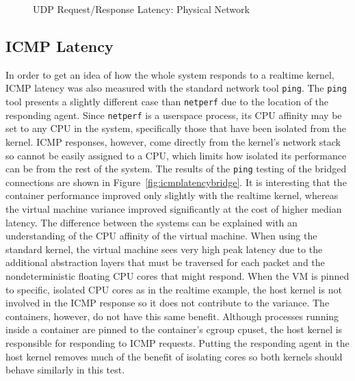 \begin{figure}
    \centering
    \def\svgwidth{\columnwidth}
    
    \caption{UDP Request/Response Latency: Physical Network}
    \label{fig:udp_rr_phys}
\end{figure}


\subsection{ICMP Latency} %
\label{sub:icmplatency}

In order to get an idea of how the whole system responds to a realtime kernel, ICMP latency was also measured with the standard network tool \texttt{ping}.  
The \texttt{ping} tool presents a slightly different case than \texttt{netperf} due to the location of the responding agent.  
Since \texttt{netperf} is a userspace process, its CPU affinity may be set to any CPU in the system, specifically those that have been isolated from the kernel.
ICMP responses, however, come directly from the kernel's network stack so cannot be easily assigned to a CPU, which limits how isolated its performance can be from the rest of the system.
The results of the \texttt{ping} testing of the bridged connections are shown in Figure~\ref{fig:icmplatencybridge}.
It is interesting that the container performance improved only slightly with the realtime kernel, whereas the virtual machine variance improved significantly at the cost of higher median latency.  
The difference between the systems can be explained with an understanding of the CPU affinity of the virtual machine.  
When using the standard kernel, the virtual machine sees very high peak latency due to the additional abstraction layers that must be traversed for each packet and the nondeterministic floating CPU cores that might respond.
When the VM is pinned to specific, isolated CPU cores as in the realtime example, the host kernel is not involved in the ICMP response so it does not contribute to the variance.
The containers, however, do not have this same benefit.
Although processes running inside a container are pinned to the container's cgroup cpuset, the host kernel is responsible for responding to ICMP requests.
Putting the responding agent in the host kernel removes much of the benefit of isolating cores so both kernels should behave similarly in this test.

